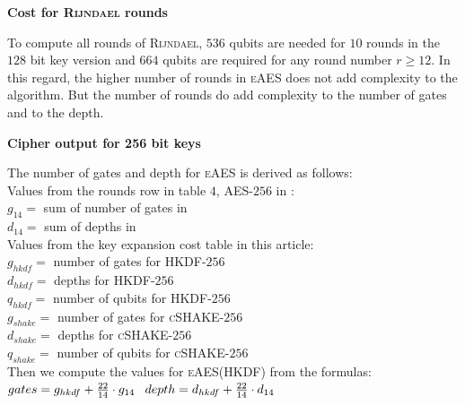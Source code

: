 \documentclass[a4paper,11pt]{article}
\begin{document}
\begin{otherlanguage}{english}
\begin{center}
\textbf{Cost for \textsc{Rijndael} rounds} \\
\end{center}

\noindent
To compute all rounds of \textsc{Rijndael}, $536$ qubits are needed for $10$ rounds in the $128$ bit key version and $664$ qubits are required for any round number $r \geq 12$. In this regard, the higher number of rounds in \textsc{eAES} does not add complexity to the algorithm. But the number of rounds do add complexity to the number of gates and to the depth. \\

\begin{center}
\textbf{Cipher output for 256 bit keys} \\
\end{center}

\noindent
The number of gates and depth for \textsc{eAES} is derived as follows: \\

\noindent
Values from the rounds row in table $4$, \textsc{AES}-$256$ in \cite{GRO} : \\ 

\noindent
$g_{14}=$ sum of number of gates in \cite{GRO} \\
$d_{14}=$ sum of depths in \cite{GRO} \\

\noindent
Values from the key expansion cost table in this article: \\

\noindent
$g_{hkdf}=$  number of gates for \textsc{HKDF}-$256$ \\
$d_{hkdf}=$  depths for \textsc{HKDF}-$256$ \\
$q_{hkdf}=$  number of qubits for \textsc{HKDF}-$256$ \\
$g_{shake}=$ number of gates for \textsc{cSHAKE}-$256$ \\
$d_{shake}=$ depths for \textsc{cSHAKE}-$256$ \\
$q_{shake}=$ number of qubits for \textsc{cSHAKE}-$256$ \\

\noindent
Then we compute the values for \textsc{eAES}(\textsc{HKDF}) from the formulas:\\
\vspace{0.5cm}
\noindent
$\small{gates} = g_{hkdf} + \frac{22}{14} \cdot g_{14} \,\,$
$\small{depth} = d_{hkdf} + \frac{22}{14} \cdot d_{14}$


\end{otherlanguage}
\end{document}
